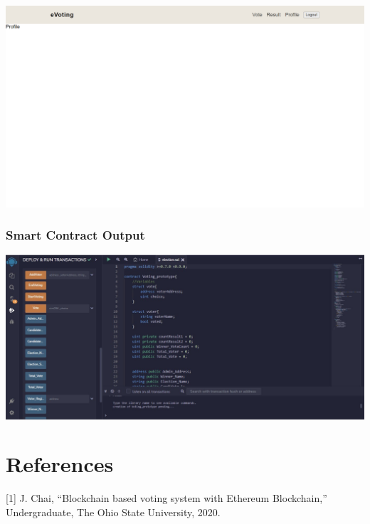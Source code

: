 \documentclass[a4paper,12pt]{report}
\begin{document}
                  \includegraphics[scale=0.25]{images/Epilog-1.png} 
               
         
         
\subsection{Smart Contract Output}
      \includegraphics[scale=0.25]{images/SmartContractOutput.jpeg}
               


\chapter{References}
       
       [1]	J. Chai, “Blockchain based voting system with Ethereum Blockchain,” Undergraduate, The Ohio State University, 2020.\\
       
\end{document}
